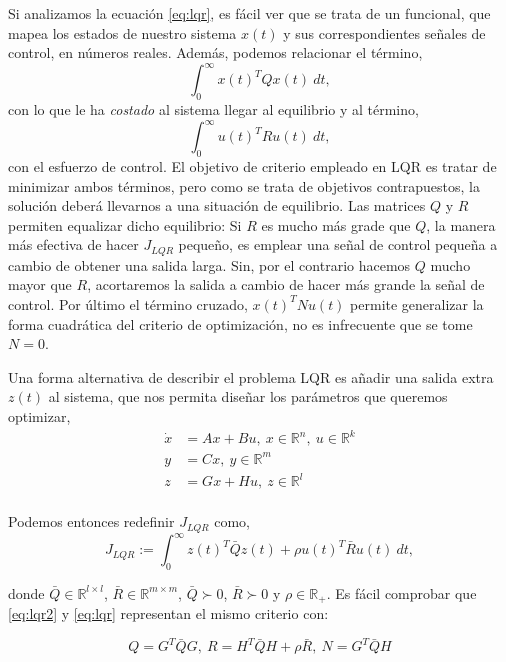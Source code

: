 Si analizamos la ecuación \ref{eq:lqr}, es fácil ver que se trata de un funcional, que mapea los estados de nuestro sistema $x(t)$ y sus correspondientes señales de control, en números reales. Además, podemos relacionar el término,
\begin{equation*}
\int_0^{\infty}x(t)^TQx(t)\ dt,
\end{equation*}
con lo que le ha \emph{costado} al sistema llegar al equilibrio y al término,
\begin{equation*}
\int_0^{\infty}u(t)^TRu(t)\ dt,
\end{equation*} 
con el esfuerzo de control. El objetivo de criterio empleado en LQR es tratar de minimizar ambos términos, pero como se trata de objetivos contrapuestos, la solución deberá llevarnos a una situación de equilibrio. Las matrices $Q$ y $R$ permiten equalizar dicho equilibrio: Si  $R$ es mucho más grade que $Q$, la manera más efectiva de hacer $J_{LQR}$ pequeño, es emplear una señal de control pequeña a cambio de obtener una salida larga. Sin, por el contrario hacemos $Q$ mucho mayor que $R$, acortaremos la salida a cambio de hacer más grande la señal de control. Por último el término cruzado, $x(t)^TNu(t)$ permite generalizar la forma cuadrática del criterio de optimización, no es infrecuente que se tome $N=0$. 

Una forma alternativa de describir el problema LQR es añadir una salida extra $z(t)$ al sistema, que nos permita diseñar los parámetros que queremos optimizar,
\begin{align*} 
\dot{x} &= Ax+Bu,\ x \in \mathbb{R}^n, \ u\in \mathbb{R}^k\\
y&=Cx,\ y \in \mathbb{R}^m\\
z &= Gx+Hu,\ z \in \mathbb{R}^l\\
\end{align*}

Podemos entonces redefinir $J_{LQR} $ como,
\begin{equation}\label{eq:lqr2}
J_{LQR} := \int_0^{\infty}z(t)^T \bar{Q}z(t)+\rho u(t)^T \bar{R}u(t)\  dt,
\end{equation}

 donde $\bar{Q}  \in \mathbb{R}^{l\times l}$,  $\bar{R} \in \mathbb{R}^{m\times m}$, $\bar{Q}\succ 0 $, $\bar{R}\succ 0 $ y $\rho \in \mathbb{R}_+$. Es fácil comprobar que \ref{eq:lqr2} y \ref{eq:lqr} representan el mismo criterio con:

 \begin{equation*}
 Q = G^T\bar{Q}G,\ R = H^T\bar{Q}H + \rho\bar{R}, \ N = G^T\bar{Q}H 
\end{equation*}   

